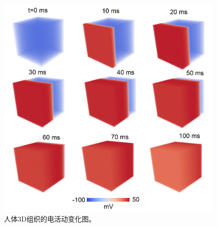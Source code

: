 \begin{figure}
 \includegraphics[width=\linewidth]{figs/tissue_activation.png}
 \caption{人体3D组织的电活动变化图。}
 \label{fig:activation}
\end{figure}


